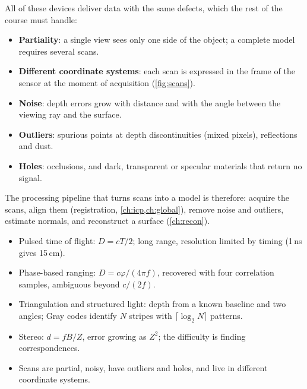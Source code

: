 All of these devices deliver data with the same defects, which the rest of the course must handle:
\begin{itemize}
  \item \textbf{Partiality}: a single view sees only one side of the object; a complete model
  requires several scans.
  \item \textbf{Different coordinate systems}: each scan is expressed in the frame of the sensor at
  the moment of acquisition (\cref{fig:scans}).
  \item \textbf{Noise}: depth errors grow with distance and with the angle between the viewing ray
  and the surface.
  \item \textbf{Outliers}: spurious points at depth discontinuities (mixed pixels), reflections and
  dust.
  \item \textbf{Holes}: occlusions, and dark, transparent or specular materials that return no
  signal.
\end{itemize}
The processing pipeline that turns scans into a model is therefore: acquire the scans, align them
(registration, \cref{ch:icp,ch:global}), remove noise and outliers, estimate normals, and reconstruct
a surface (\cref{ch:recon}).


\begin{keypoints}
\begin{itemize}[leftmargin=*]
  \item Pulsed time of flight: $D=cT/2$; long range, resolution limited by timing (1\,ns gives
  15\,cm).
  \item Phase-based ranging: $D=c\varphi/(4\pi f)$, recovered with four correlation samples,
  ambiguous beyond $c/(2f)$.
  \item Triangulation and structured light: depth from a known baseline and two angles; Gray codes
  identify $N$ stripes with $\lceil\log_2N\rceil$ patterns.
  \item Stereo: $d=fB/Z$, error growing as $Z^2$; the difficulty is finding correspondences.
  \item Scans are partial, noisy, have outliers and holes, and live in different coordinate systems.
\end{itemize}
\end{keypoints}

